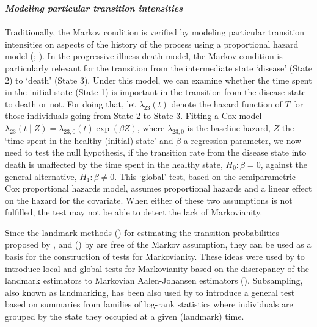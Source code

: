 \textit{\textbf{Modeling particular transition intensities}}\\\\
Traditionally, the Markov condition is verified by modeling particular transition intensities on aspects of the history of the process using a proportional hazard model (\citealp{Kay1986}; \citealp{Andersen2000, Andersen2002}). In the progressive illness-death model, the Markov condition is particularly relevant for the transition from the intermediate state `disease' (State 2) to `death' (State 3). Under this model, we can examine whether the time spent in the initial state (State 1) is important in the transition from the disease state to death or not. For doing that, let $\lambda_{23}(t)$ denote the hazard function of $T$ for those individuals going from State 2 to State 3. Fitting a Cox model $\lambda_{23}(t\mid Z)=\lambda_{23,0}(t)\exp(\beta Z)$, where $\lambda_{23,0}$ is the baseline hazard, $Z$ the `time spent in the healthy (initial) state' and $\beta$ a regression parameter, we now need to test the null hypothesis, if the transition rate from the disease state into death is unaffected by the time spent in the healthy state, $H_0:\beta=0$, against the general alternative, $H_1:\beta\neq 0$. This `global' test, based on the semiparametric Cox proportional hazards model, assumes proportional hazards and a linear effect on the hazard for the covariate. When either of these two assumptions is not fulfilled, the test may not be able to detect the lack of Markovianity. 

Since the landmark methods () for estimating the transition probabilities proposed by \cite{AlvarezMM2015}, and () by \cite{PutterSpitoni2018} are free of the Markov assumption, they can be used as a basis for the construction of tests for Markovianity. These ideas were used by \cite{soutinho_machado2020} to introduce local and global tests for Markovianity based on the discrepancy of the landmark estimators to Markovian Aalen-Johansen estimators (). Subsampling, also known as landmarking, has been also used by \cite{Titman2020} to introduce a general test based on summaries from families of log-rank statistics where individuals are grouped by the state they occupied at a given (landmark) time.\\

